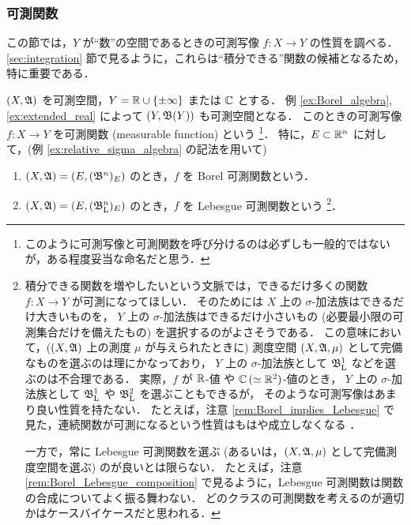 \subsubsection{可測関数}

この節では，$Y$ が``数''の空間であるときの可測写像 $f:X\to Y$ の性質を調べる．
\ref{sec:integration} 節で見るように，これらは``積分できる''関数の候補となるため，特に重要である．

\begin{definition}\label{def:measurable_function}
    $(X,\mathfrak{A})$ を可測空間，$Y=\mathbb{R}\cup\{\pm\infty\} $ または $\mathbb{C}$ とする．
    例 \ref{ex:Borel_algebra}, \ref{ex:extended_real} によって $(Y,\mathfrak{B}(Y))$ も可測空間となる．
    このときの可測写像 $f:X\to Y$ を可測関数 (measurable function) という
    \footnote{このように可測写像と可測関数を呼び分けるのは必ずしも一般的ではないが，ある程度妥当な命名だと思う\cite{ms95741}．}．
    特に，$E\subset\mathbb{R}^n$ に対して，(例 \ref{ex:relative_sigma_algebra} の記法を用いて)
    \begin{enumerate}
        \item $(X,\mathfrak{A})=(E,(\mathfrak{B}^n)_E)$ のとき，$f$ を Borel 可測関数という．
        \item $(X,\mathfrak{A})=(E,(\mathfrak{B}_{\mathrm{L}}^n)_E)$ のとき，$f$ を Lebesgue 可測関数という
            \footnote{
                積分できる関数を増やしたいという文脈では，できるだけ多くの関数 $f:X\to Y$ が可測になってほしい．
                そのためには $X$ 上の $\sigma$-加法族はできるだけ大きいものを，
                $Y$ 上の $\sigma$-加法族はできるだけ小さいもの (必要最小限の可測集合だけを備えたもの) を選択するのがよさそうである．
                この意味において，($(X,\mathfrak{A})$ 上の測度 $\mu$ が与えられたときに) 測度空間 $(X,\mathfrak{A},\mu)$ として完備なものを選ぶのは理にかなっており，
                $Y$ 上の $\sigma$-加法族として $\mathfrak{B}_{\mathrm{L}}^1$ などを選ぶのは不合理である．
                実際，$f$ が $\mathbb{R}$-値 や $\mathbb{C}\,(\simeq\mathbb{R}^2)$-値のとき，
                $Y$ 上の $\sigma$-加法族として $\mathfrak{B}_{\mathrm{L}}^1$ や $\mathfrak{B}_{\mathrm{L}}^2$ を選ぶこともできるが，
                そのような可測写像はあまり良い性質を持たない．
                たとえば，注意 \ref{rem:Borel_implies_Lebesgue} で見た，連続関数が可測になるという性質はもはや成立しなくなる \cite{mo31603}．

                一方で，常に Lebesgue 可測関数を選ぶ (あるいは，$(X,\mathfrak{A},\mu)$ として完備測度空間を選ぶ) のが良いとは限らない．
                たとえば，注意 \ref{rem:Borel_Lebesgue_composition} で見るように，Lebesgue 可測関数は関数の合成についてよく振る舞わない．
                どのクラスの可測関数を考えるのが適切かはケースバイケースだと思われる．
            }．
    \end{enumerate}
\end{definition}

